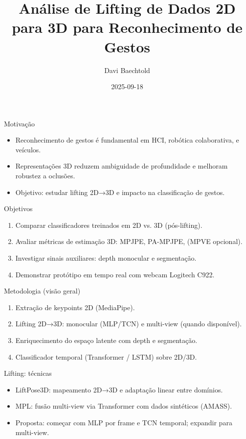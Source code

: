 \documentclass{beamer}
\title{Análise de Lifting de Dados 2D para 3D \newline para Reconhecimento de Gestos}
\author{Davi Baechtold}
\date{2025-09-18}
\begin{document}
\begin{frame}
  \titlepage
\end{frame}

\begin{frame}{Motivação}
  \begin{itemize}
    \item Reconhecimento de gestos é fundamental em HCI, robótica colaborativa, e veículos.
    \item Representações 3D reduzem ambiguidade de profundidade e melhoram robustez a oclusões.
    \item Objetivo: estudar lifting 2D→3D e impacto na classificação de gestos.
  \end{itemize}
\end{frame}

\begin{frame}{Objetivos}
  \begin{enumerate}
    \item Comparar classificadores treinados em 2D vs. 3D (pós-lifting).
    \item Avaliar métricas de estimação 3D: MPJPE, PA-MPJPE, (MPVE opcional).
    \item Investigar sinais auxiliares: depth monocular e segmentação.
    \item Demonstrar protótipo em tempo real com webcam Logitech C922.
  \end{enumerate}
\end{frame}

\begin{frame}{Metodologia (visão geral)}
  \begin{enumerate}
    \item Extração de keypoints 2D (MediaPipe).
    \item Lifting 2D→3D: monocular (MLP/TCN) e multi-view (quando disponível).
    \item Enriquecimento do espaço latente com depth e segmentação.
    \item Classificador temporal (Transformer / LSTM) sobre 2D/3D.
  \end{enumerate}
\end{frame}

\begin{frame}{Lifting: técnicas}
  \begin{itemize}
    \item LiftPose3D: mapeamento 2D→3D e adaptação linear entre domínios.
    \item MPL: fusão multi-view via Transformer com dados sintéticos (AMASS).
    \item Proposta: começar com MLP por frame e TCN temporal; expandir para multi-view.
  \end{itemize}
\end{frame}
\end{document}
